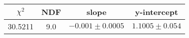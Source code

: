 \begin{tabular}{|c|c|c|c|}

\hline
$\chi^{2}$ & NDF & slope & y-intercept  \\
\hline
30.5211 & 9.0 & $-0.001\pm0.0005$ & $1.1005\pm0.054$ \\
\hline

\end{tabular}